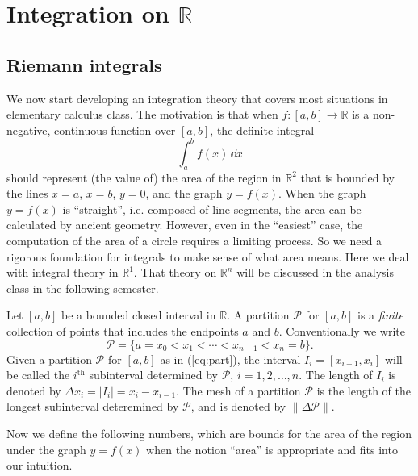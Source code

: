 \chapter{Integration on $\mathbb{R}$}
\label{sec:integration}

\section{Riemann integrals}
\label{sec:Riemann-integral}

We now start developing an integration theory that covers most situations in elementary calculus class.
The motivation is that when $f : [a,b] \to \mathbb{R}$ is a non-negative, continuous function over $[a,b]$, the definite integral
\[
  \int_a^b f(x) \, \dd x
\]
should represent (the value of) the area of the region in $\mathbb{R}^2$ that is bounded by the lines $x=a$, $x=b$, $y=0$, and the graph $y = f(x)$.
When the graph $y = f(x)$ is ``straight'', i.e. composed of line segments, the area can be calculated by ancient geometry.
However, even in the ``easiest'' case, the computation of the area of a circle requires a limiting process.
So we need a rigorous foundation for integrals to make sense of what area means.
Here we deal with integral theory in $\mathbb{R}^1$.
That theory on $\mathbb{R}^n$ will be discussed in the analysis class in the following semester.

\begin{defn}
  Let $[a,b]$ be a bounded closed interval in $\mathbb{R}$.
  A \textsf{partition} $\mathcal{P}$ for $[a,b]$ is a \textit{finite} collection of points that includes the endpoints $a$ and $b$.
  Conventionally we write
  \begin{equation}
    \label{eq:part}
    \mathcal{P} = \{ a = x_0 < x_1 < \cdots < x_{n-1} < x_n = b \}.
  \end{equation}
  Given a partition $\mathcal{P}$ for $[a,b]$ as in (\ref{eq:part}), the interval $I_i = [x_{i-1}, x_i]$ will be called the $i^{\text{th}}$ subinterval determined by $\mathcal{P}$, $i = 1, 2, \dots, n$.
  The length of $I_i$ is denoted by $\Delta x_i = |I_i| = x_i - x_{i-1}$.
  The \textsf{mesh} of a partition $\mathcal{P}$ is the length of the longest subinterval deteremined by $\mathcal{P}$, and is denoted by $\| \Delta \mathcal{P} \|$.
\end{defn}

Now we define the following numbers, which are bounds for the area of the region under the graph $y = f(x)$ when the notion ``area'' is appropriate and fits into our intuition.

